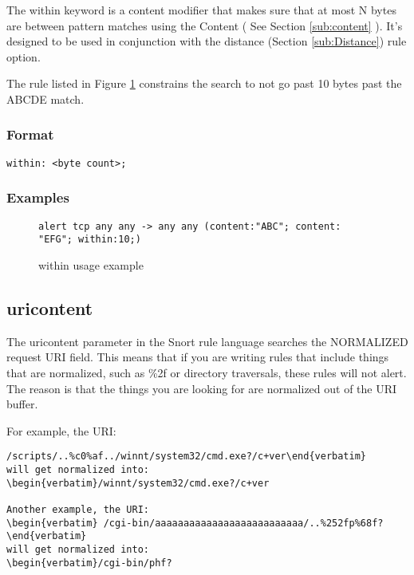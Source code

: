 \documentclass[english]{report}
\begin{document}
The within keyword is a content modifier that makes sure that
at most N bytes are between pattern matches using the Content ( See
Section \ref{sub:content} ).  It's designed to be used in conjunction
with the distance (Section \ref{sub:Distance}) rule option.

The rule listed in Figure \ref{fig:Within} constrains the search to not
go past 10 bytes past the ABCDE match. 

\subsubsection{Format}

\begin{verbatim}
within: <byte count>;
\end{verbatim}

\subsubsection{Examples}

\begin{figure}[!hbpt]
\begin{verbatim}
alert tcp any any -> any any (content:"ABC"; content: "EFG"; within:10;)
\end{verbatim}
\caption{within usage example \label{fig:Within}}
\end{figure}


\subsection{uricontent}

The uricontent parameter in the Snort rule language searches the NORMALIZED
request \textsc{URI} field.  This means that if you are writing rules that include
things that are normalized, such as \%2f or directory traversals, these rules
will not alert.  The reason is that the things you are looking for are
normalized out of the URI buffer.  

For example, the URI: 
\begin{verbatim}/scripts/..%c0%af../winnt/system32/cmd.exe?/c+ver\end{verbatim}
will get normalized into:
\begin{verbatim}/winnt/system32/cmd.exe?/c+ver

Another example, the URI:
\begin{verbatim} /cgi-bin/aaaaaaaaaaaaaaaaaaaaaaaaaa/..%252fp%68f? \end{verbatim}
will get normalized into:
\begin{verbatim}/cgi-bin/phf?\end{verbatim}
\end{document}

